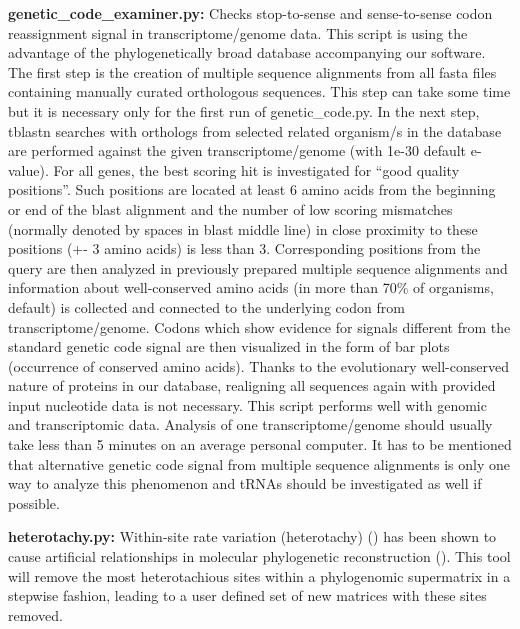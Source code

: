 \documentclass{article}
\begin{document}
\begin{description}
    \item \textbf{genetic\_code\_examiner.py:} Checks stop-to-sense and sense-to-sense codon reassignment signal in transcriptome/genome data. This script is using the advantage of the phylogenetically broad database accompanying our software. The first step is the creation of multiple sequence alignments from all fasta files containing manually curated orthologous sequences. This step can take some time but it is necessary only for the first run of genetic\_code.py. In the next step, tblastn searches with orthologs from selected related organism/s in the database are performed against the given transcriptome/genome (with 1e-30 default e-value). For all genes, the best scoring hit is investigated for “good quality positions''. Such positions are located at least 6 amino acids from the beginning or end of the blast alignment and the number of low scoring mismatches (normally denoted by spaces in blast middle line) in close proximity to these positions (+- 3 amino acids) is less than 3. Corresponding positions from the query are then analyzed in previously prepared multiple sequence alignments and information about well-conserved amino acids (in more than 70\% of organisms, default) is collected and connected to the underlying codon from transcriptome/genome. Codons which show evidence for signals different from the standard genetic code signal are then visualized in the form of bar plots (occurrence of conserved amino acids). Thanks to the evolutionary well-conserved nature of proteins in our database, realigning all sequences again with provided input nucleotide data is not necessary. This script performs well with genomic and transcriptomic data. Analysis of one transcriptome/genome should usually take less than 5 minutes on an average personal computer. It has to be mentioned that alternative genetic code signal from multiple sequence alignments is only one way to analyze this phenomenon and tRNAs should be investigated as well if possible.

    \item \textbf{heterotachy.py:} Within-site rate variation (heterotachy) (\cite{Lopez-Heterotachy}) has been shown to cause artificial relationships in molecular phylogenetic reconstruction (\cite{Inagaki-Heterotachy}).  This tool will remove the most heterotachious sites within a phylogenomic supermatrix in a stepwise fashion, leading to a user defined set of new matrices with these sites removed.


\end{description}
\end{document}
